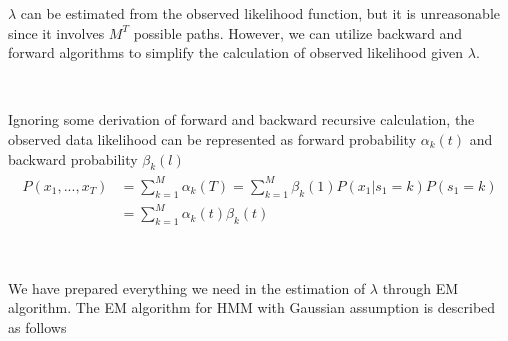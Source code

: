 \documentclass[a4paper]{article}
\begin{document}
$\lambda$ can be estimated from the observed likelihood function, but it is unreasonable since it involves $M^T$ possible paths. However, we can utilize backward and forward algorithms to simplify the calculation of observed likelihood given $\lambda$.

\

Ignoring some derivation of forward and backward recursive calculation, the observed data likelihood can be represented as forward probability $\alpha_k (t)$ and backward probability $\beta_k (l)$
\begin{align}
\begin{split}
	P(x_1, ..., x_T)  &  = \sum_{k=1}^{M} \alpha_k (T) = \sum_{k=1}^{M} \beta_k (1) P(x_1 | s_1 = k) P(s_1 = k) \\
	& = \sum_{k=1}^{M} \alpha_k(t) \beta_k (t)
\end{split}
\end{align}

\

We have prepared everything we need in the estimation of $\lambda$ through EM algorithm. The EM algorithm for HMM with Gaussian assumption is described as follows
\end{document}
